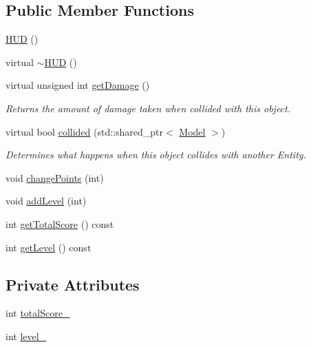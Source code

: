 \subsection*{\-Public \-Member \-Functions}
\begin{DoxyCompactItemize}
\item 
\hyperlink{classmodels_1_1HUD_adde70cb1c9828c7dd0fd413e7083eb54}{\-H\-U\-D} ()
\item 
virtual \hyperlink{classmodels_1_1HUD_a6dfdcea8a4668c9d84487de3701b4af1}{$\sim$\-H\-U\-D} ()
\item 
virtual unsigned int \hyperlink{classmodels_1_1HUD_aee06209660cb6adb125e7ea2d5a9f8a5}{get\-Damage} ()
\begin{DoxyCompactList}\small\item\em \-Returns the amount of damage taken when collided with this object. \end{DoxyCompactList}\item 
virtual bool \hyperlink{classmodels_1_1HUD_a40cf78366537ffdd42d31b38bd172fae}{collided} (std\-::shared\-\_\-ptr$<$ \hyperlink{classmodels_1_1Model}{\-Model} $>$)
\begin{DoxyCompactList}\small\item\em \-Determines what happens when this object collides with another \-Entity. \end{DoxyCompactList}\item 
void \hyperlink{classmodels_1_1HUD_ac30c9bfc28d492b06be4cd9633aa363d}{change\-Points} (int)
\item 
void \hyperlink{classmodels_1_1HUD_a5aec09cf3947d269d43988efb64cf1c9}{add\-Level} (int)
\item 
int \hyperlink{classmodels_1_1HUD_ab194a35974d1be58dda6584d4759e677}{get\-Total\-Score} () const 
\item 
int \hyperlink{classmodels_1_1HUD_aa94a0d2bbc0f38562e48a5eca15637b1}{get\-Level} () const 
\end{DoxyCompactItemize}
\subsection*{\-Private \-Attributes}
\begin{DoxyCompactItemize}
\item 
int \hyperlink{classmodels_1_1HUD_ad01ce2899fd56af3dcc73d94454f676e}{total\-Score\-\_\-}
\item 
int \hyperlink{classmodels_1_1HUD_ad60199df8348afb4be0fba2a252674d8}{level\-\_\-}
\end{DoxyCompactItemize}


